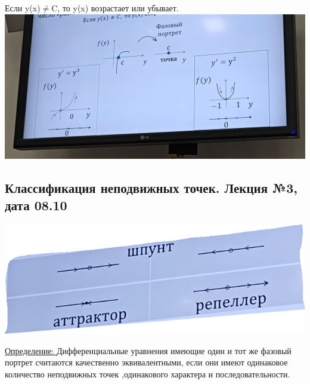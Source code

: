 \documentclass[12pt]{article}
\let\ORIincludegraphics\includegraphics
\renewcommand{\includegraphics}[2][]{\ORIincludegraphics[scale=0.65,#1]{#2}}
\begin{document}
  \begin{center}
    Если y(x)$\not =$C, то y(x) возрастает или убывает.\\
    \includegraphics[scale=0.7]{"1.4.5.png"}

  \end{center}
  \subsection{Классификация неподвижных точек. Лекция №3, дата 08.10}
  \begin{center}
    \includegraphics{"1.5.1.png"}
  \end{center}
  \underline{Определение: } Дифференциальные уравнения имеющие один и тот же фазовый портрет
  считаются качественно эквивалентными, если они имеют одинаковое количество неподвижных точек
  ,одинакового характера и последовательности.
\end{document}
